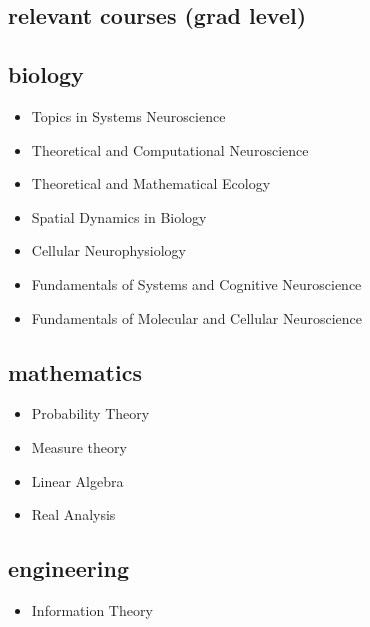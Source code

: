 \documentclass[11pt]{friggeri-cv}
\begin{document}
\begin{multicols}{2}[]

\setlength\columnsep{0em}

\begin{minipage}{1.1\columnwidth}
\section{relevant courses (grad level)}


\subsection{biology}

\begin{itemize}

\item Topics in Systems Neuroscience
\item Theoretical and Computational Neuroscience
\item Theoretical and Mathematical Ecology
\item Spatial Dynamics in Biology
\item Cellular Neurophysiology
\item Fundamentals of Systems and Cognitive Neuroscience
\item Fundamentals of Molecular and Cellular Neuroscience
\end{itemize}


\subsection{mathematics}
\begin{itemize}
\item Probability Theory
\item Measure theory
\item Linear Algebra
\item Real Analysis
\end{itemize}

\subsection{engineering}
\begin{itemize}
\item Information Theory
\end{itemize}





\end{minipage}


\end{multicols}
\end{document}
